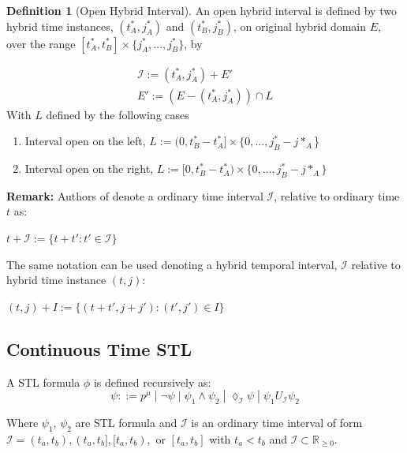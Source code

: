 \documentclass{article}
\theoremstyle{definition}
\newtheorem{definition}{Definition}[section]
\begin{document}
\begin{definition}[Open Hybrid Interval]
An open hybrid interval is defined by two hybrid time instances, $(t^*_A,j^*_A)$ and $(t^*_B,j^*_B)$, on original hybrid domain $E$, over the range $[t^*_A, t^*_B]\times\{j^*_A,..., j^*_B\}$, by

\begin{gather}
    \mathcal{I} := (t^*_A,j^*_A) + E'\\
    E' := (E - (t^*_A,j^*_A)) \cap L
\end{gather}
With $L$ defined by the following cases
\begin{enumerate}
    \item Interval open on the left, $L := (0,t^*_B - t^*_A]\times \{0,...,j^*_B-j*_A$\}\\
    \item Interval open on the right, $L := [0,t^*_B - t^*_A)\times \{0,...,j^*_B-j*_A\}$
\end{enumerate}

\end{definition}


\clearpage
\begin{flushleft}
\textbf{Remark:}
Authors of \cite{hutchison_robust_2010} denote a ordinary time interval $\mathcal{I}$, relative to ordinary time $t$ as: 
\end{flushleft}

\begin{center}
$t + \mathcal{I} := \{t+t': t' \in \mathcal{I}\}$ 
\end{center}
The same notation can be used denoting a hybrid temporal interval, $\mathcal{I}$ relative to hybrid time instance $(t,j)$:
\begin{center}
    $(t,j) + I := \{(t+t',j+j'): (t',j') \in I\}$
\end{center}


\clearpage
\subsection{Continuous Time STL}
A STL formula $\phi$ is defined recursively as:
\begin{equation}
    \psi ::= p^\mu\;|\;\lnot \psi\;|\;\psi_1 \land \psi_2\;|\;\lozenge_{\mathcal{I}} \psi\;|\;\psi_1 U_{\mathcal{I}} \psi_2
\end{equation}


Where $\psi_1$, $\psi_2$ are STL formula and $\mathcal{I}$ is an ordinary time interval of form $\mathcal{I} = (t_a,t_b),(t_a,t_b],[t_a,t_b),$ or $[t_a,t_b]$ with $t_a < t_b$ and $\mathcal{I} \subset \mathbb{R}_{\geq 0}$.
\end{document}
